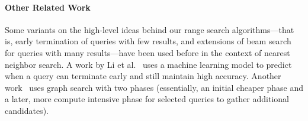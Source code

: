 \paragraph{Other Related Work} Some variants on the high-level ideas behind our range search algorithms---that is, early termination of queries with few results, and extensions of beam search for queries with many results---have been used before in the context of nearest neighbor search. A work by Li et al.~\cite{li2020improving} uses a machine learning model to predict when a query can terminate early and still maintain high accuracy. Another work~\cite{xu2021twostage} uses graph search with two phases (essentially, an initial cheaper phase and a later, more compute intensive phase for selected queries to gather additional candidates). 
